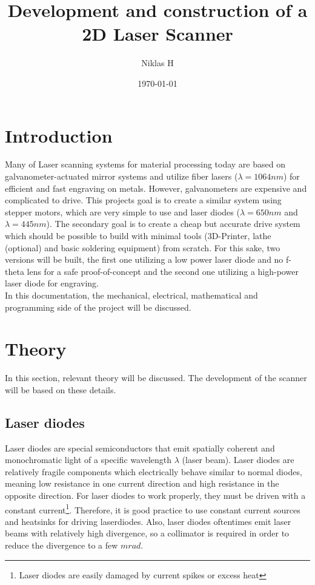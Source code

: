 \documentclass[a4paper, 11pt]{scrartcl}
\title {Development and construction of a 2D Laser Scanner}
\author {Niklas H}
\date {\today}
\begin{document}
\maketitle
\tableofcontents
\newpage
\section{Introduction}
Many of Laser scanning systems for material processing today are based on galvanometer-actuated mirror systems and utilize fiber lasers ($\lambda = 1064nm$) for efficient and fast engraving on metals. However, galvanometers are expensive and complicated to drive.  This projects goal is to create a similar system using stepper motors, which are very simple to use and laser diodes ($\lambda=650nm$ and $\lambda=445nm$). The secondary goal is to create a cheap but accurate drive system which should be possible to build with minimal tools (3D-Printer, lathe (optional) and basic soldering equipment) from scratch. For this sake, two versions will be built, the first one utilizing a low power laser diode and no f-theta lens for a safe proof-of-concept and the second one utilizing a high-power laser diode for engraving. \\
In this documentation, the mechanical, electrical, mathematical and programming side of the project will be discussed.

\section{Theory}
In this section, relevant theory will be discussed. The development of the scanner will be based on these details. \\
\subsection{Laser diodes} 
Laser diodes are special semiconductors that emit spatially coherent and monochromatic light of a specific wavelength $\lambda$ (laser beam). Laser diodes are relatively fragile components which electrically behave similar to normal diodes, meaning low resistance in one current direction and high resistance in the opposite direction. For laser diodes to work properly, they must be driven with a constant current\footnote{Laser diodes are easily damaged by current spikes or excess heat}. Therefore, it is good practice to use constant current sources and heatsinks for driving laserdiodes. Also, laser diodes oftentimes emit laser beams with relatively high divergence, so a collimator is required in order to reduce the divergence to a few $mrad$. 
\end{document}
